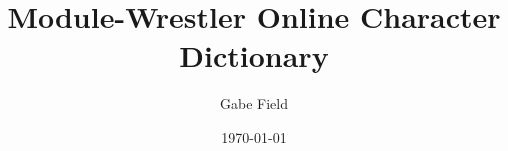 


\title{Module-Wrestler Online Character Dictionary}
\author{Gabe Field}
\date{\today}




\maketitle




% 


